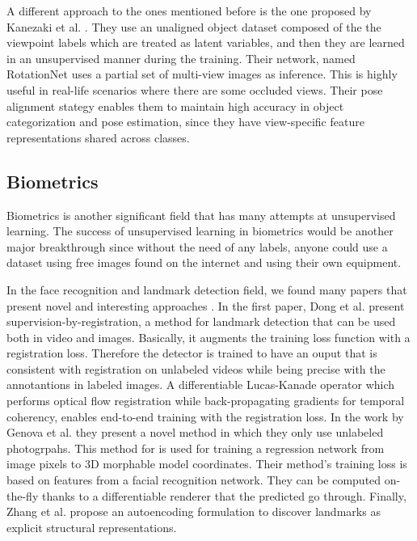 \documentclass[letterpaper, 10 pt, conference]{ieeeconf}  %
\begin{document}
A different approach to the ones mentioned before is the one proposed by Kanezaki et al. \cite{Kanezaki_2018_CVPR}. They use an unaligned object dataset composed of the the viewpoint labels which are treated as latent variables, and then they are learned in an unsupervised manner during the training. Their network, named RotationNet uses a partial set of multi-view images as inference. This is highly useful in real-life scenarios where there are some occluded views. Their pose alignment stategy enables them to maintain high accuracy in object categorization and pose estimation, since they have view-specific feature representations shared across classes.

\subsection{Biometrics}

Biometrics is another significant field that has many attempts at unsupervised learning. The success of unsupervised learning in biometrics would be another major breakthrough since without the need of any labels, anyone could use a dataset using free images found on the internet and using their own equipment. 

In the face recognition and landmark detection field, we found many papers that present novel and interesting approaches \cite{Dong_2018_CVPR} \cite{Genova_2018_CVPR} \cite{Wang_2018_CVPR}. In the first paper, Dong et al. present supervision-by-registration, a method for landmark detection that can be used both in video and images. Basically, it augments the training loss function with a registration loss. Therefore the detector is trained to have an ouput that is consistent with registration on unlabeled videos while being precise with the annotantions in labeled images. A differentiable Lucas-Kanade operator which performs optical flow registration while back-propagating gradients for temporal coherency, enables end-to-end training with the registration loss. In the work by Genova et al. they present a novel method in which they only use unlabeled photogrpahs. This method for is used for training a regression network from image pixels to 3D morphable model coordinates. Their method's training loss is based on features from a facial recognition network. They can be computed on-the-fly thanks to a differentiable renderer that the predicted go through.  Finally, Zhang et al.\cite{Zhang_2018_CVPR} propose an autoencoding formulation to discover landmarks as explicit structural representations.
\end{document}
